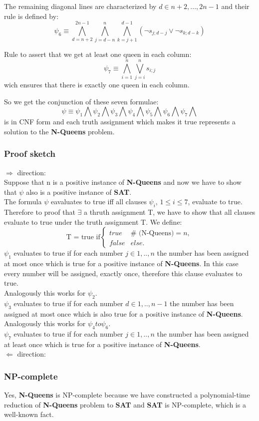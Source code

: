 \noindent The remaining diagonal lines are characterized by $d \in {n+2,...,2n-1}$ and their rule is defined by:
$$\psi_6 \equiv \bigwedge_{d=n+2}^{2n-1}\bigwedge_{j=d-n}^{n}\bigwedge_{k=j+1}^{d-1}(\neg s_{j;d-j} \vee \neg s_{k;d-k})$$

\noindent Rule to assert that we get at least one queen in each column:
$$\psi_7 \equiv \bigwedge_{i=1}^{n}\bigvee_{j=i}^{n}s_{i;j}$$
wich ensures that there is exactly one queen in each column.

\noindent So we get the conjunction of these seven formulae:
$$\psi \equiv \psi_1\bigwedge\psi_2\bigwedge\psi_3\bigwedge\psi_4\bigwedge\psi_5\bigwedge\psi_6\bigwedge\psi_7\bigwedge$$
is in CNF form and each truth assignment which makes it true represents a solution to the \textbf{N-Queens} problem.

\subsubsection{Proof sketch}
$\Rightarrow$ direction:\\
Suppose that n is a positive instance of \textbf{N-Queens} and now we have to show that
$\psi$ also is a positive instance of \textbf{SAT}.\\
The formula $\psi$ eavaluates to true iff all clauses $\psi_i$, $1 \leq i \leq 7$, evaluate to true. 
Therefore to proof that $\exists$ a thruth assignment T, we have to show that all clauses
evaluate to true under the truth assignment T. We define:\\
$$\text{T = true if} 
\left\{ 
\begin{array}{cl}
true & \# \text{ (N-Queens)} = n, \\ 
false & else.
\end{array}%
\right. $$
$\psi_1$ evaluates to true if for each number $j \in {1,..,n}$ the number 
has been assigned at most once which is true for a positive instance of \textbf{N-Queens}.
In this case every number will be assigned, exactly once, therefore this clause evaluates
to true.\\
Analogously this works for $\psi_2$.\\
$\psi_3$ evaluates to true if for each number $d \in {1,..,n-1}$ the number 
has been assigned at most once which is also true for a positive instance of \textbf{N-Queens}.\\
Analogously this works for $\psi_4 to \psi_6$.\\
$\psi_7$ evaluates to true if for each number $j \in {1,..,n}$ the number 
has been assigned at least once which is true for a positive instance of \textbf{N-Queens}.\\

$\Leftarrow$ direction:\\

\subsubsection{NP-complete}
Yes, \textbf{N-Queens} is NP-complete because we have constructed a polynomial-time 
reduction of \textbf{N-Queens} problem to \textbf{SAT} and \textbf{SAT} is NP-complete, 
which is a well-known fact.

